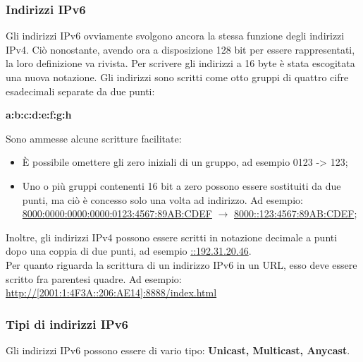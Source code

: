             \subsubsection*{Indirizzi IPv6}
            Gli indirizzi IPv6 ovviamente svolgono ancora la stessa funzione degli indirizzi IPv4. Ciò
            nonostante, avendo ora a disposizione 128 bit per essere rappresentati, la loro definizione va
            rivista. Per scrivere gli indirizzi a 16 byte è stata escogitata una nuova notazione. Gli indirizzi
            sono scritti come otto gruppi di quattro cifre esadecimali separate da due punti:
            \begin{center}
                \textbf{a:b:c:d:e:f:g:h}
            \end{center}
            Sono ammesse alcune scritture facilitate:
            \begin{itemize}
                \item È possibile omettere gli zero iniziali di un gruppo, ad esempio 0123 -> 123;
                \item Uno o più gruppi contenenti 16 bit a zero possono essere sostituiti da due punti, ma ciò
                è concesso solo una volta ad indirizzo. Ad esempio:
                \underline{8000:0000:0000:0000:0123:4567:89AB:CDEF} $\rightarrow$ \underline{8000::123:4567:89AB:CDEF};
            \end{itemize}

            Inoltre, gli indirizzi IPv4 possono essere scritti in notazione decimale a punti dopo una coppia
            di due punti, ad esempio \underline{::192.31.20.46}.\\

            Per quanto riguarda la scrittura di un indirizzo IPv6 in un URL, esso deve essere scritto fra
            parentesi quadre. Ad esempio: \url{http://[2001:1:4F3A::206:AE14]:8888/index.html}
            
            \subsubsection*{Tipi di indirizzi IPv6}
            Gli indirizzi IPv6 possono essere di vario tipo: \textbf{Unicast, Multicast, Anycast}.
            
